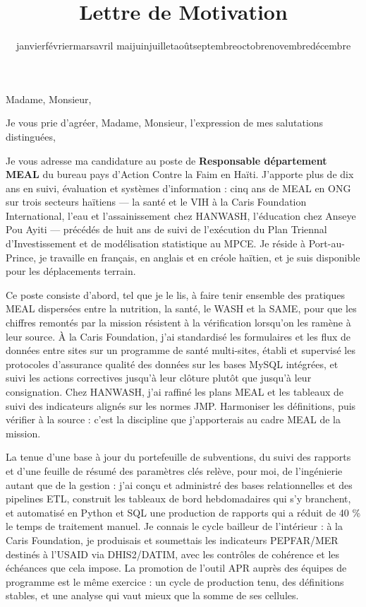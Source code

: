 \documentclass[10pt,a4paper,sans]{moderncv}
\title{Lettre de Motivation}
\renewcommand{\today}{\number\day\space\ifcase\month\or janvier\or février\or mars\or avril\or
mai\or juin\or juillet\or août\or septembre\or octobre\or novembre\or décembre\fi\space\number\year}
\begin{document}
\date{\today}
\opening{Madame, Monsieur,}
\closing{Je vous prie d'agréer, Madame, Monsieur, l'expression de mes salutations distinguées,}

\makelettertitle

Je vous adresse ma candidature au poste de \textbf{Responsable département MEAL} du bureau pays d'Action Contre la Faim en Haïti. J'apporte plus de dix ans en suivi, évaluation et systèmes d'information : cinq ans de MEAL en ONG sur trois secteurs haïtiens --- la santé et le VIH à la Caris Foundation International, l'eau et l'assainissement chez HANWASH, l'éducation chez Anseye Pou Ayiti --- précédés de huit ans de suivi de l'exécution du Plan Triennal d'Investissement et de modélisation statistique au MPCE. Je réside à Port-au-Prince, je travaille en français, en anglais et en créole haïtien, et je suis disponible pour les déplacements terrain.

Ce poste consiste d'abord, tel que je le lis, à faire tenir ensemble des pratiques MEAL dispersées entre la nutrition, la santé, le WASH et la SAME, pour que les chiffres remontés par la mission résistent à la vérification lorsqu'on les ramène à leur source. À la Caris Foundation, j'ai standardisé les formulaires et les flux de données entre sites sur un programme de santé multi-sites, établi et supervisé les protocoles d'assurance qualité des données sur les bases MySQL intégrées, et suivi les actions correctives jusqu'à leur clôture plutôt que jusqu'à leur consignation. Chez HANWASH, j'ai raffiné les plans MEAL et les tableaux de suivi des indicateurs alignés sur les normes JMP. Harmoniser les définitions, puis vérifier à la source : c'est la discipline que j'apporterais au cadre MEAL de la mission.

La tenue d'une base à jour du portefeuille de subventions, du suivi des rapports et d'une feuille de résumé des paramètres clés relève, pour moi, de l'ingénierie autant que de la gestion : j'ai conçu et administré des bases relationnelles et des pipelines ETL, construit les tableaux de bord hebdomadaires qui s'y branchent, et automatisé en Python et SQL une production de rapports qui a réduit de 40 \% le temps de traitement manuel. Je connais le cycle bailleur de l'intérieur : à la Caris Foundation, je produisais et soumettais les indicateurs PEPFAR/MER destinés à l'USAID via DHIS2/DATIM, avec les contrôles de cohérence et les échéances que cela impose. La promotion de l'outil APR auprès des équipes de programme est le même exercice : un cycle de production tenu, des définitions stables, et une analyse qui vaut mieux que la somme de ses cellules.
\end{document}
